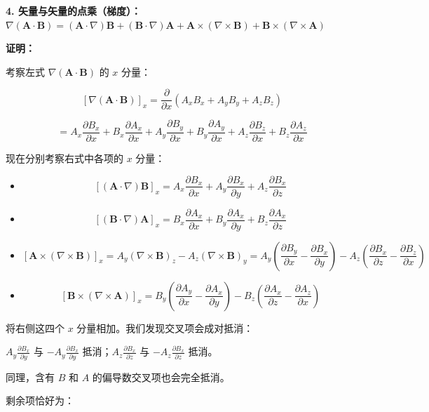 \textbf{4. 矢量与矢量的点乘（梯度）：}
\(\nabla (\mathbf{A} \cdot \mathbf{B}) = (\mathbf{A} \cdot \nabla)\mathbf{B} + (\mathbf{B} \cdot \nabla)\mathbf{A} + \mathbf{A} \times (\nabla \times \mathbf{B}) + \mathbf{B} \times (\nabla \times \mathbf{A})\)

\textbf{证明：}

考察左式 \(\nabla(\mathbf{A} \cdot \mathbf{B})\) 的 \(x\) 分量：

\[
[\nabla(\mathbf{A} \cdot \mathbf{B})]_x = \frac{\partial}{\partial x}(A_x B_x + A_y B_y + A_z B_z)
\]

\[
= A_x \frac{\partial B_x}{\partial x} + B_x \frac{\partial A_x}{\partial x} + A_y \frac{\partial B_y}{\partial x} + B_y \frac{\partial A_y}{\partial x} + A_z \frac{\partial B_z}{\partial x} + B_z \frac{\partial A_z}{\partial x}
\]

现在分别考察右式中各项的 \(x\) 分量：

\begin{itemize}
\tightlist
\item
  \[
  [(\mathbf{A} \cdot \nabla)\mathbf{B}]_x = A_x\frac{\partial B_x}{\partial x} + A_y\frac{\partial B_x}{\partial y} + A_z\frac{\partial B_x}{\partial z}
  \]
\item
  \[
  [(\mathbf{B} \cdot \nabla)\mathbf{A}]_x = B_x\frac{\partial A_x}{\partial x} + B_y\frac{\partial A_x}{\partial y} + B_z\frac{\partial A_x}{\partial z}
  \]
\item
  \[
  [\mathbf{A} \times (\nabla \times \mathbf{B})]_x = A_y(\nabla \times \mathbf{B})_z - A_z(\nabla \times \mathbf{B})_y = A_y\left(\frac{\partial B_y}{\partial x} - \frac{\partial B_x}{\partial y}\right) - A_z\left(\frac{\partial B_x}{\partial z} - \frac{\partial B_z}{\partial x}\right)
  \]
\item
  \[
  [\mathbf{B} \times (\nabla \times \mathbf{A})]_x = B_y\left(\frac{\partial A_y}{\partial x} - \frac{\partial A_x}{\partial y}\right) - B_z\left(\frac{\partial A_x}{\partial z} - \frac{\partial A_z}{\partial x}\right)
  \]
\end{itemize}

将右侧这四个 \(x\) 分量相加。我们发现交叉项会成对抵消：

\(A_y\frac{\partial B_x}{\partial y}\) 与
\(-A_y\frac{\partial B_x}{\partial y}\)
抵消；\(A_z\frac{\partial B_x}{\partial z}\) 与
\(-A_z\frac{\partial B_x}{\partial z}\) 抵消。

同理，含有 \(B\) 和 \(A\) 的偏导数交叉项也会完全抵消。

剩余项恰好为：

